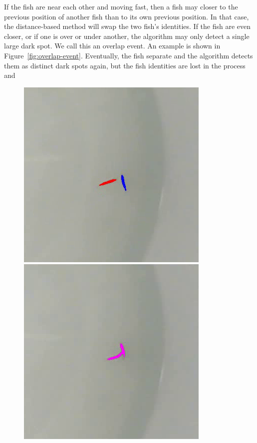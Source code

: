 \documentclass{article}
\newlength{\mylen}
\begin{document}
If the fish are near each other and moving fast, then a fish may closer to the previous position of another fish than to its own previous position. In that case, the distance-based method will swap the two fish's identities. 
If the fish are even closer, or if one is over or under another, the algorithm may only detect a single large dark spot. We call this an overlap event. An example is shown in Figure~\ref{fig:overlap-event}. Eventually, the fish separate and the algorithm detects them as distinct dark spots again, but the fish identities are lost in the process and 
\begin{figure}[H]
	\centering
	\setlength{\mylen}{0.32\linewidth}
	\includegraphics[height=\mylen]{overlap-event1}%
	\hspace{0.01\linewidth}%
	\includegraphics[height=\mylen]{overlap-event2}%
	\hspace{0.01\linewidth}%

\end{figure}
\end{document}
